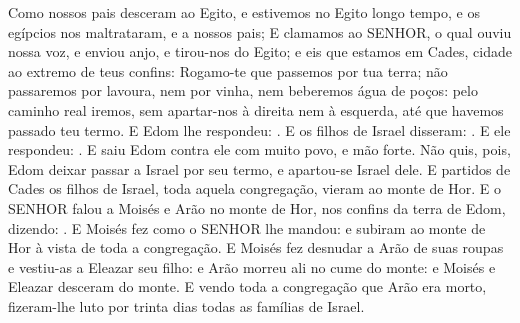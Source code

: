{{{{  Como nossos pais desceram ao Egito, e estivemos no Egito longo tempo, e os egípcios nos maltrataram, e a nossos pais;
  E clamamos ao SENHOR, o qual ouviu nossa voz, e enviou anjo, e tirou-nos do Egito; e eis que estamos em Cades, cidade ao extremo de teus confins:
  Rogamo-te que passemos por tua terra; não passaremos por lavoura, nem por vinha, nem beberemos água de poços: pelo caminho real iremos, sem apartar-nos à direita nem à esquerda, até que havemos passado teu termo}}}.
  E Edom lhe respondeu: .
  E os filhos de Israel disseram: .
  E ele respondeu: . E saiu Edom contra ele com muito povo, e mão forte.
  Não quis, pois, Edom deixar passar a Israel por seu termo, e apartou-se Israel dele.
  E partidos de Cades os filhos de Israel, toda aquela congregação, vieram ao monte de Hor.
  E o SENHOR falou a Moisés e Arão no monte de Hor, nos confins da terra de Edom, dizendo:
  . %
  E Moisés fez como o SENHOR lhe mandou: e subiram ao monte de Hor à vista de toda a congregação.
  E Moisés fez desnudar a Arão de suas roupas e vestiu-as a Eleazar seu filho: e Arão morreu ali no cume do monte: e Moisés e Eleazar desceram do monte.
  E vendo toda a congregação que Arão era morto, fizeram-lhe luto por trinta dias todas as famílias de Israel.
\par }

